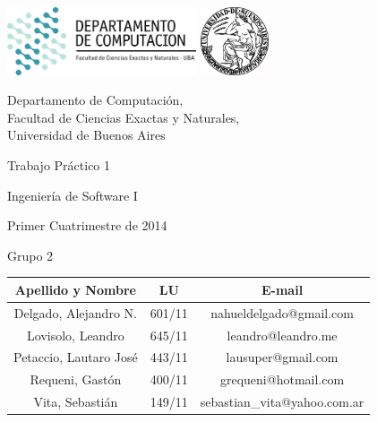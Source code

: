 \documentclass[a4paper, 10pt, twoside]{article}
\begin{document}


\thispagestyle{caratula}

\begin{center}

\includegraphics[height=2cm]{DC.png} 
\hfill
\includegraphics[height=2cm]{UBA.jpg} 

\vspace{2cm}

Departamento de Computación,\\
Facultad de Ciencias Exactas y Naturales,\\
Universidad de Buenos Aires

\vspace{4cm}

\begin{Huge}
Trabajo Práctico 1
\end{Huge}

\vspace{0.5cm}

\begin{Large}
Ingeniería de Software I
\end{Large}

\vspace{1cm}

Primer Cuatrimestre de 2014

\vspace{4cm}

\begin{Large}
Grupo 2
\end{Large}

\vspace{0.5cm}

\begin{tabular}{|c|c|c|}
\hline
Apellido y Nombre & LU & E-mail\\
\hline
Delgado, Alejandro N.  & 601/11 & nahueldelgado@gmail.com\\
Lovisolo, Leandro      & 645/11 & leandro@leandro.me\\
Petaccio, Lautaro José & 443/11 & lausuper@gmail.com\\
Requeni, Gastón        & 400/11 & grequeni@hotmail.com\\
Vita, Sebastián        & 149/11 & sebastian\_vita@yahoo.com.ar\\
\hline
\end{tabular}

\end{center}
\end{document}
